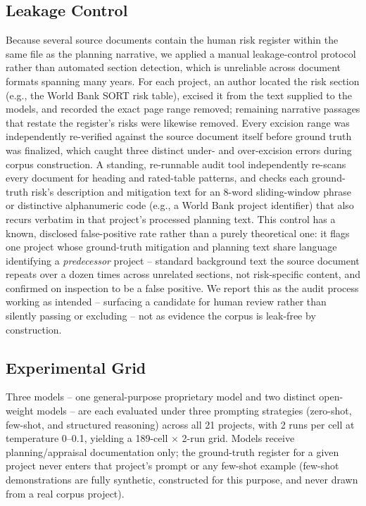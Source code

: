 \documentclass[conference]{IEEEtran}
\begin{document}
\subsection{Leakage Control}
Because several source documents contain the human risk register within the
same file as the planning narrative, we applied a manual leakage-control
protocol rather than automated section detection, which is unreliable
across document formats spanning many years. For each project, an author
located the risk section (e.g., the World Bank SORT risk table), excised it
from the text supplied to the models, and recorded the exact page range
removed; remaining narrative passages that restate the register's risks
were likewise removed. Every excision range was independently
re-verified against the source document itself before ground truth was
finalized, which caught three distinct under- and over-excision errors
during corpus construction. A standing, re-runnable audit tool independently
re-scans every document for heading and rated-table patterns, and checks
each ground-truth risk's description and mitigation text for an 8-word
sliding-window phrase or distinctive alphanumeric code (e.g., a World Bank
project identifier) that also recurs verbatim in that project's processed
planning text. This control has a known, disclosed false-positive rate
rather than a purely theoretical one: it flags one project whose
ground-truth mitigation and planning text share language identifying a
\emph{predecessor} project -- standard background text the source document
repeats over a dozen times across unrelated sections, not risk-specific
content, and confirmed on inspection to be a false positive. We report this
as the audit process working as intended -- surfacing a candidate for human
review rather than silently passing or excluding -- not as evidence the
corpus is leak-free by construction.

\subsection{Experimental Grid}
Three models -- one general-purpose proprietary model and two distinct
open-weight models -- are each evaluated under three prompting
strategies (zero-shot, few-shot, and structured reasoning) across all 21
projects, with 2 runs per cell at temperature 0--0.1, yielding a
189-cell $\times$ 2-run grid. Models receive planning/appraisal
documentation only; the ground-truth register for a given project never
enters that project's prompt or any few-shot example (few-shot
demonstrations are fully synthetic, constructed for this purpose, and never
drawn from a real corpus project).
\end{document}
